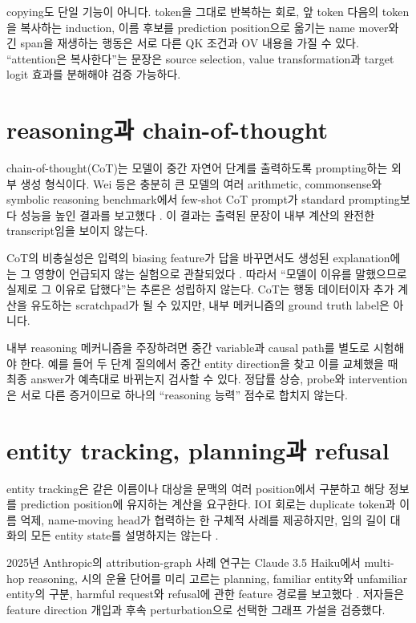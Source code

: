 copying도 단일 기능이 아니다.
token을 그대로 반복하는 회로, 앞 token 다음의 token을 복사하는 induction, 이름 후보를 prediction position으로 옮기는 name mover와 긴 span을 재생하는 행동은 서로 다른 QK 조건과 OV 내용을 가질 수 있다.
``attention은 복사한다''는 문장은 source selection, value transformation과 target logit 효과를 분해해야 검증 가능하다.

\section{reasoning과 chain-of-thought}

chain-of-thought(CoT)는 모델이 중간 자연어 단계를 출력하도록 prompting하는 외부 생성 형식이다.
Wei 등은 충분히 큰 모델의 여러 arithmetic, commonsense와 symbolic reasoning benchmark에서 few-shot CoT prompt가 standard prompting보다 성능을 높인 결과를 보고했다 \citep{wei2022cot}.
이 결과는 출력된 문장이 내부 계산의 완전한 transcript임을 보이지 않는다.

CoT의 비충실성은 입력의 biasing feature가 답을 바꾸면서도 생성된 explanation에는 그 영향이 언급되지 않는 실험으로 관찰되었다 \citep{turpin2023unfaithful}.
따라서 ``모델이 이유를 말했으므로 실제로 그 이유로 답했다''는 추론은 성립하지 않는다.
CoT는 행동 데이터이자 추가 계산을 유도하는 scratchpad가 될 수 있지만, 내부 메커니즘의 ground truth label은 아니다.

내부 reasoning 메커니즘을 주장하려면 중간 variable과 causal path를 별도로 시험해야 한다.
예를 들어 두 단계 질의에서 중간 entity direction을 찾고 이를 교체했을 때 최종 answer가 예측대로 바뀌는지 검사할 수 있다.
정답률 상승, probe와 intervention은 서로 다른 증거이므로 하나의 ``reasoning 능력'' 점수로 합치지 않는다.

\section{entity tracking, planning과 refusal}

entity tracking은 같은 이름이나 대상을 문맥의 여러 position에서 구분하고 해당 정보를 prediction position에 유지하는 계산을 요구한다.
IOI 회로는 duplicate token과 이름 억제, name-moving head가 협력하는 한 구체적 사례를 제공하지만, 임의 길이 대화의 모든 entity state를 설명하지는 않는다 \citep{wang2022ioi}.

2025년 Anthropic의 attribution-graph 사례 연구는 Claude 3.5 Haiku에서 multi-hop reasoning, 시의 운율 단어를 미리 고르는 planning, familiar entity와 unfamiliar entity의 구분, harmful request와 refusal에 관한 feature 경로를 보고했다 \citep{lindsey2025biology}.
저자들은 feature direction 개입과 후속 perturbation으로 선택한 그래프 가설을 검증했다.

